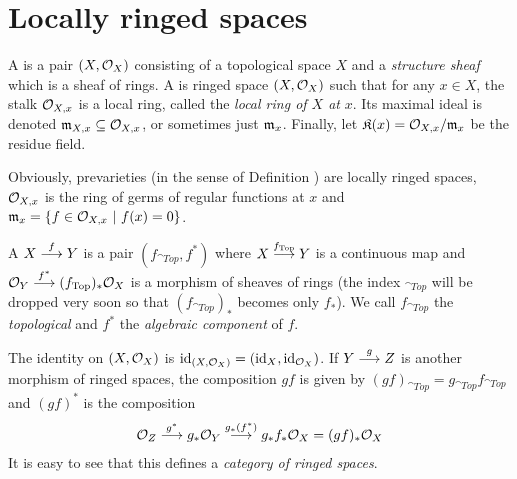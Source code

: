 \documentclass[a4paper,parskip=half,numbers=enddot, DIV=12]{scrreprt}
\begin{document}
\section{Locally ringed spaces}
\begin{defi}
    A  is a pair $(X,\mathcal{O}_X)$ consisting of a topological space $X$ and a \emph{structure sheaf} which is a sheaf of rings. A  is ringed space $(X,\mathcal{O}_X)$ such that for any $x\in X$, the stalk $\mathcal{O}_{X,x}$ is a local ring, called the \emph{local ring of $X$ at} $x$. Its maximal ideal is denoted $\mathfrak{m}_{X,x}\subseteq \mathcal{O}_{X,x}$, or sometimes just $\mathfrak{m}_x$. Finally, let $\mathfrak{K}(x) = \mathcal{O}_{X,x}/\mathfrak{m}_x$ be the residue field.
\end{defi}
\begin{rem}
    Obviously, prevarieties (in the sense of Definition ) are locally ringed spaces, $\mathcal{O}_{X,x}$ is the ring of germs of regular functions at $x$ and $\mathfrak{m}_x = \left\{f\in \mathcal{O}_{X,x} \ \middle|\  f(x) = 0 \right\}$.
\end{rem}
\begin{defi} 
    A  $X\morphism[f] Y$ is a pair $(f_{\cat{Top}}, f^*)$ where $X\morphism[f_{\cat{Top}}] Y$ is a continuous map and $\Oo_Y \morphism[f^*] (f_{\cat{Top}})_*\Oo_X$ is a morphism of sheaves of rings (the index $_{\cat{Top}}$ will be dropped very soon so that $(f_{\cat{Top}})_*$ becomes only $f_*$). We call $f_{\cat{Top}}$ the \emph{topological} and $f^*$ the \emph{algebraic component} of $f$. 
    
    The identity on $(X,\mathcal{O}_X)$ is $\operatorname{id}_{(X,\mathcal{O}_X)} = (\operatorname{id}_X, \operatorname{id}_{\mathcal{O}_X})$. If $Y\morphism[g]Z$ is another morphism of ringed spaces, the composition $gf$ is given by $(gf)_{\cat{Top}} = g_{\cat{Top}} f_{\cat{Top}}$ and $(gf)^*$ is the composition 
    \begin{align*}
        \Oo_Z \morphism[g^*] g_*\Oo_Y \morphism[g_*(f^*)] g_*f_*\Oo_X = (gf)_*\Oo_X
    \end{align*} 
    It is easy to see that this defines a \emph{category of ringed spaces}.
\end{defi}
\end{document}
